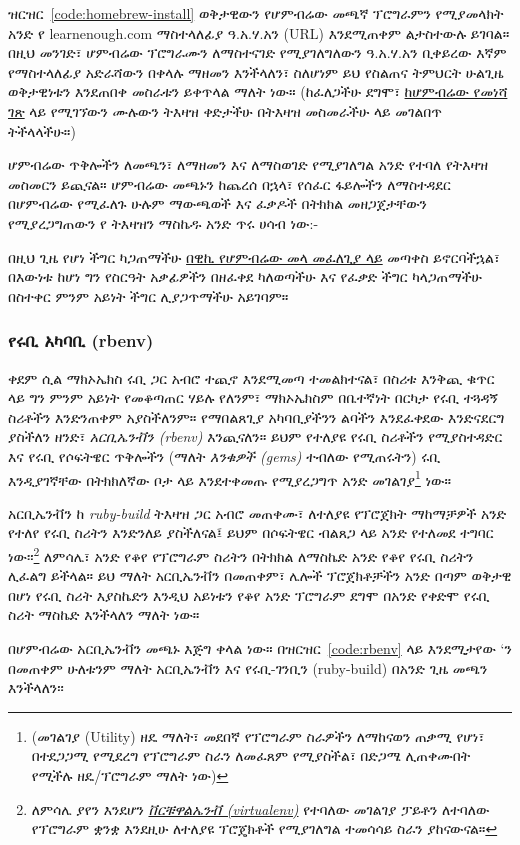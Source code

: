 \noindent ዝርዝር~\ref{code:homebrew-install} ወቅታዊውን የሆምብሬው መጫኛ ፕሮግራምን የሚያመላክት አንድ የ learnenough.com ማስተላለፊያ ዓ.አ.ሃ.አን (URL) እንደሚጠቀም ልታስተውሉ ይገባል። በዚህ መንገድ፣ ሆምብሬው ፕሮግራሙን ለማስተናገድ የሚያገለግለውን ዓ.አ.ሃ.አን ቢቀይረው እኛም የማስተላለፊያ አድራሻውን በቀላሉ ማዘመን እንችላለን፣ ስለሆነም ይህ የስልጠና ትምህርት ሁልጊዜ ወቅታዊነቱን እንደጠበቀ መስራቱን ይቀጥላል ማለት ነው። (ከፈለጋችሁ ደግሞ፣ \href{http://brew.sh/}{ከሆምብሬው የመነሻ ገጽ} ላይ የሚገኘውን ሙሉውን ትእዛዝ ቀድታችሁ በትእዛዝ መስመራችሁ ላይ መገልበጥ ትችላላችሁ።)

ሆምብሬው ጥቅሎችን ለመጫን፣ ለማዘመን እና ለማስወገድ የሚያገለግል አንድ  የተባለ የትእዛዝ መስመርን ይጪናል። ሆምብሬው መጫኑን ከጨረሰ በኋላ፣ የሰፈር ፋይሎችን ለማስተዳደር በሆምብሬው የሚፈለጉ ሁሉም ማውጫወች እና ፈቃዶች በትክክል መዘጋጀታቸውን የሚያረጋግጠውን የ  ትእዛዝን ማስኬዱ አንድ ጥሩ ሀሳብ ነው:-


\noindent በዚህ ጊዜ የሆነ ችግር ካጋጠማችሁ \href{https://github.com/Homebrew/homebrew/wiki/troubleshooting}{በዊኪ የሆምብሬው መላ መፈለጊያ ላይ} መጣቀስ ይኖርባችኋል፣ በእውነቱ ከሆነ ግን የስርዓት አቃፊዎችን በዘፈቀደ ካለወጣችሁ እና የፈቃድ ችግር ካላጋጠማችሁ በስተቀር ምንም አይነት ችግር ሊያጋጥማችሁ አይገባም።

\subsubsection{የሩቢ አካባቢ (rbenv)}
\label{sec:rbenv}

ቀደም ሲል ማክኦኤክስ ሩቢ ጋር አብሮ ተጪኖ እንደሚመጣ ተመልክተናል፣ በስሪቱ እንቅጪ ቁጥር ላይ ግን ምንም አይነት የመቆጣጠር ሃይሉ የለንም፣ ማክኦኤክስም በቤተኛነት በርካታ የሩቢ ተጓዳኝ ስሪቶችን እንድንጠቀም አያስችለንም። የማበልጸጊያ አካባቢያችንን ልባችን እንደፈቀደው እንድናደርግ ያስችለን ዘንድ፣ \emph{አርቢኤንቭን (rbenv)} እንጪናለን። ይህም የተለያዩ የሩቢ ስሪቶችን የሚያስተዳድር እና የሩቢ የሶፍትዌር ጥቅሎችን (ማለት \emph{እንቁዎች (gems)} ተብለው የሚጠሩትን) ሩቢ እንዲያገኛቸው በትክክለኛው ቦታ ላይ እንደተቀመጡ የሚያረጋግጥ አንድ መገልገያ\footnote{(መገልገያ (Utility) ዘዴ ማለት፣ መደበኛ የፕሮግራም ስራዎችን ለማከናወን ጠቃሚ የሆነ፣ በተደጋጋሚ የሚደረግ የፕሮግራም ስራን ለመፈጸም የሚያስችል፣ በድጋሜ ሊጠቀሙበት የሚችሉ ዘዴ/ፕሮግራም ማለት ነው)} ነው።

አርቢኤንቭን ከ \emph{ruby-build} ትእዛዝ ጋር አብሮ መጠቀሙ፣ ለተለያዩ የፕሮጀክት ማከማቻዎች አንድ የተለየ የሩቢ ስሪትን እንድንለይ ያስችለናል፤ ይህም በሶፍትዌር ብልጸጋ ላይ አንድ የተለመደ ተግባር ነው፡፡\footnote{ለምሳሌ ያየን እንደሆን \href{http://docs.python-guide.org/en/latest/dev/virtualenvs/}{\emph{ቨርቹዋልኤንቭ (virtualenv)}} የተባለው መገልገያ ፓይቶን ለተባለው የፕሮግራም ቋንቋ እንደዚሁ ለተለያዩ ፕሮጄክቶች የሚያገለግል ተመሳሳይ ስራን ያከናውናል።} ለምሳሌ፣ አንድ የቆየ የፕሮግራም ስሪትን በትክክል ለማስኬድ አንድ የቆየ የሩቢ ስሪትን ሊፈልግ ይችላል። ይህ ማለት አርቢኤንቭን በመጠቀም፣ ሌሎች ፕሮጀክቶቻችን አንድ በጣም ወቅታዊ በሆነ የሩቢ ስሪት እያስኬድን እንዲህ አይነቱን የቆየ አንድ ፕሮግራም ደግሞ በአንድ የቀድሞ የሩቢ ስሪት ማስኬድ እንችላለን ማለት ነው።

በሆምብሬው አርቢኤንቭን መጫኑ እጅግ ቀላል ነው። በዝርዝር~\ref{code:rbenv} ላይ እንደሚታየው  `ን በመጠቀም ሁለቱንም ማለት አርቢኤንቭን እና የሩቢ-ገንቢን (ruby-build) በአንድ ጊዜ መጫን እንችላለን፡፡

